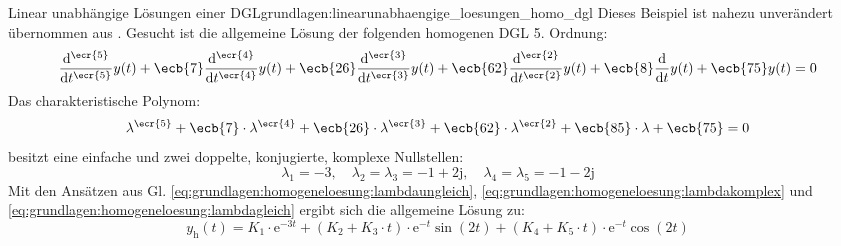 \begin{frame}
{    \begin{bsp}{Linear unabhängige Lösungen einer DGL}{grundlagen:linearunabhaengige_loesungen_homo_dgl}
        Dieses Beispiel ist nahezu unverändert übernommen aus \cite[S. 241]{albach}. 
        Gesucht ist die allgemeine Lösung der folgenden homogenen DGL 5. Ordnung:
        \begin{equation*}
            \frac{\mathrm{d}^{\ecr{5}}}{\mathrm{d}t^{\ecr{5}}} y(t) + \ecb{7} \frac{\mathrm{d}^{\ecr{4}}}{\mathrm{d}t^{\ecr{4}}} y(t) + \ecb{26} \frac{\mathrm{d}^{\ecr{3}}}{\mathrm{d}t^{\ecr{3}}} y(t) + \ecb{62} \frac{\mathrm{d}^{\ecr{2}}}{\mathrm{d}t^{\ecr{2}}} y(t) + \ecb{8} \frac{\mathrm{d}}{\mathrm{d}t} y(t) + \ecb{75} y(t) = 0
        \end{equation*}
        Das charakteristische Polynom:
        \begin{equation*}
            \lambda^{\ecr{5}} + \ecb{7} \cdot \lambda^{\ecr{4}} + \ecb{26} \cdot \lambda^{\ecr{3}} + \ecb{62} \cdot \lambda^{\ecr{2}} + \ecb{85} \cdot \lambda + \ecb{75} = 0
        \end{equation*}
        besitzt eine einfache und zwei doppelte, konjugierte, komplexe Nullstellen:
        \begin{equation*}
            \lambda_1 = -3, \quad \lambda_2 = \lambda_3 = -1+\mathrm{2j}, \quad \lambda_4 = \lambda_5 = -1-\mathrm{2j}
        \end{equation*}
        Mit den Ansätzen aus Gl. \ref{eq:grundlagen:homogeneloesung:lambdaungleich}, \ref{eq:grundlagen:homogeneloesung:lambdakomplex} und
        \ref{eq:grundlagen:homogeneloesung:lambdagleich} ergibt sich die allgemeine Lösung zu:
        \begin{equation*}
            y_{\mathrm{h}}(t) = K_1 \cdot \mathrm{e}^{-3 t} + (K_2 + K_3 \cdot t) \cdot \mathrm{e}^{-t} \sin(2t) + (K_4 + K_5 \cdot t) \cdot \mathrm{e}^{-t} \cos(2t)
        \end{equation*}
    \end{bsp}
}%
\end{frame}

